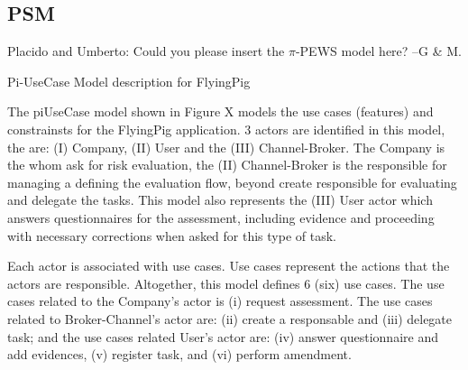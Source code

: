 \subsection{PSM}

{\color{magenta} Placido and Umberto: Could you please insert the $\pi$-PEWS model here? --G \& M.}



Pi-UseCase Model description for FlyingPig

The piUseCase model shown in Figure  X models the use cases (features) and constrainsts for the FlyingPig application. 3 actors are identified in this model, the are: (I) Company, (II) User and the (III) Channel-Broker. The Company is the whom ask for risk evaluation, the (II) Channel-Broker is the responsible for managing a defining the evaluation flow, beyond create responsible for evaluating and delegate the tasks. This model also represents the (III) User actor which answers questionnaires for the assessment, including evidence and proceeding with necessary corrections when asked for this type of task.

Each actor is associated with use cases. Use cases represent the actions that the actors are responsible. Altogether, this model defines 6 (six) use cases. The use cases related to the Company's actor is (i) request assessment. The use cases related to Broker-Channel's actor are: (ii) create a responsable and (iii) delegate task; and the use cases related User's actor are: (iv) answer questionnaire and add evidences, (v) register task, and (vi) perform amendment.

